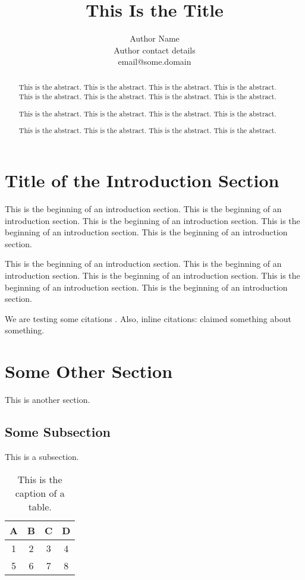 \documentclass[a4paper]{article}
\title{This Is the Title}
\author{Author Name\\
Author contact details\\
email@some.domain
}
\begin{document}
\maketitle

\begin{abstract}
This is the abstract.
This is the abstract.
This is the abstract.
This is the abstract.
This is the abstract.
This is the abstract.
This is the abstract.
This is the abstract.

This is the abstract.
This is the abstract.
This is the abstract.
This is the abstract.

This is the abstract.
This is the abstract.
This is the abstract.
This is the abstract.
\end{abstract}

\section{Title of the Introduction Section}

This is the beginning of an introduction section.
This is the beginning of an introduction section.
This is the beginning of an introduction section.
This is the beginning of an introduction section.
This is the beginning of an introduction section.

This is the beginning of an introduction section.
This is the beginning of an introduction section.
This is the beginning of an introduction section.
This is the beginning of an introduction section.
This is the beginning of an introduction section. 

We are testing some citations \cite{elman1990,su2019improving,galassi2019attention,book2019title}.
Also, inline citations:  claimed something about something.

\section{Some Other Section}

This is another section.

\subsection{Some Subsection}

This is a subsection.

\begin{table}[htbp]
\begin{center}
\begin{tabular}{c|ccc}
A & B & C & D\\
\hline
1 & 2 & 3 & 4\\
5 & 6 & 7 & 8
\end{tabular}
\end{center}
\caption{This is the caption of a table.}
\label{table:test}
\end{table}
\end{document}
